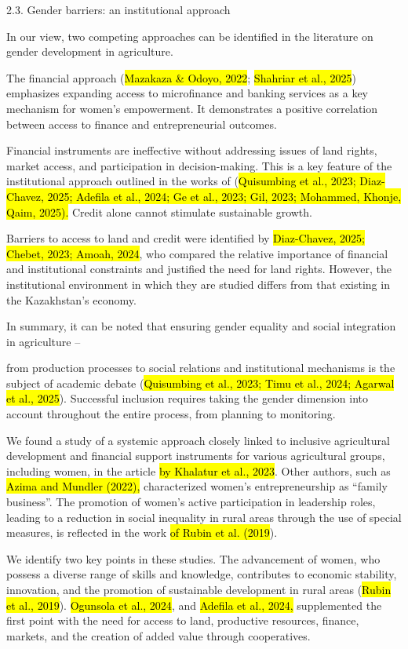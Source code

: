 2.3. Gender barriers: an institutional approach

In our view, two competing approaches can be identified in the
literature on gender development in agriculture.

The financial approach (\hl{Mazakaza \& Odoyo, 2022}; \hl{Shahriar et
al., 2025}) emphasizes expanding access to microfinance and banking
services as a key mechanism for women's empowerment. It demonstrates a
positive correlation between access to finance and entrepreneurial
outcomes.

Financial instruments are ineffective without addressing issues of land
rights, market access, and participation in decision-making. This is a
key feature of the institutional approach outlined in the works of
(\hl{Quisumbing et al., 2023; Diaz-Chavez, 2025; Adefila et al., 2024;
Ge et al., 2023; Gil, 2023; Mohammed, Khonje, Qaim, 2025).} Credit alone
cannot stimulate sustainable growth.

Barriers to access to land and credit were identified by
\hl{Diaz-Chavez, 2025; Chebet, 2023; Amoah, 2024}, who compared the
relative importance of financial and institutional constraints and
justified the need for land rights. However, the institutional
environment in which they are studied differs from that existing in the
Kazakhstan's economy.

In summary, it can be noted that ensuring gender equality and social
integration in agriculture --

from production processes to social relations and institutional
mechanisms is the subject of academic debate (\hl{Quisumbing et al.,
2023; Timu et al., 2024; Agarwal et al., 2025}). Successful inclusion
requires taking the gender dimension into account throughout the entire
process, from planning to monitoring.

We found a study of a systemic approach closely linked to inclusive
agricultural development and financial support instruments for various
agricultural groups, including women, in the article \hl{by Khalatur et
al., 2023}. Other authors, such as \hl{Azima and Mundler (2022),}
characterized women's entrepreneurship as ``family business''. The
promotion of women's active participation in leadership roles, leading
to a reduction in social inequality in rural areas through the use of
special measures, is reflected in the work \hl{of Rubin et al. (2019}).

We identify two key points in these studies. The advancement of women,
who possess a diverse range of skills and knowledge, contributes to
economic stability, innovation, and the promotion of sustainable
development in rural areas (\hl{Rubin et al., 2019}). \hl{Ogunsola et
al., 2024}, and \hl{Adefila et al., 2024,} supplemented the first point
with the need for access to land, productive resources, finance,
markets, and the creation of added value through cooperatives.

